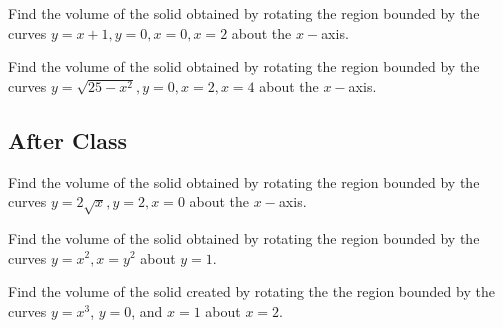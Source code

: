 \documentclass[notes]{subfiles}
\begin{document}
		\begin{ex}
			Find the volume of the solid obtained by rotating the region bounded by the curves $y = x+1,y=0,x=0,x=2$ about the $x-$axis.
		\end{ex}
			
		\begin{ex}
			Find the volume of the solid obtained by rotating the region bounded by the curves $y = \sqrt{25-x^2},y=0,x=2,x=4$ about the $x-$axis.
		\end{ex}
			\newpage
				
	\subsection*{After Class}	
		\begin{ex}
			Find the volume of the solid obtained by rotating the region bounded by the curves $y = 2\sqrt{x}, y=2, x=0$ about the $x-$axis.
		\end{ex}
			
		\begin{ex}
			Find the volume of the solid obtained by rotating the region bounded by the curves $y = x^2,x=y^2$ about $y = 1$.
		\end{ex}
			\newpage
			
		\begin{ex}
			Find the volume of the solid created by rotating the the region bounded by the curves $y= x^3$, $y = 0$, and $x = 1$ about $x = 2$.
		\end{ex}
			
	\clearpage
\end{document}
